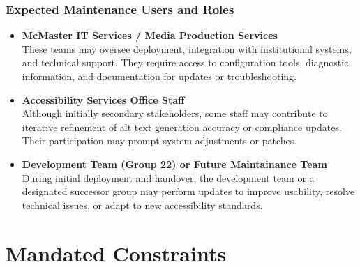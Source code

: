 \documentclass[12pt]{article}
\begin{document}
\subsubsection*{Expected Maintenance Users and Roles}
\begin{itemize}
  \item \textbf{McMaster IT Services / Media Production Services} \\
    These teams may oversee deployment, integration with
    institutional systems, and technical support. They require access
    to configuration tools, diagnostic information, and documentation
    for updates or troubleshooting.
  \item \textbf{Accessibility Services Office Staff} \\
    Although initially secondary stakeholders, some staff may
    contribute to iterative refinement of alt text generation
    accuracy or compliance updates. Their participation may prompt
    system adjustments or patches.
  \item \textbf{Development Team (Group 22) or Future Maintainance Team} \\
    During initial deployment and handover, the development team or a
    designated successor group may perform updates to improve
    usability, resolve technical issues, or adapt to new
    accessibility standards.
\end{itemize}

\section{Mandated Constraints}
\end{document}
